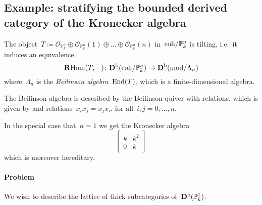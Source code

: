 \documentclass[10pt,a4paper]{article}
\begin{document}
\subsection{Example: stratifying the bounded derived category of the Kronecker algebra}
\begin{theorem}[Beilinson]
  The object~$T\coloneqq\mathcal{O}_{\mathbb{P}_k^n}\oplus\mathcal{O}_{\mathbb{P}_k^n}(1)\oplus\ldots\oplus\mathcal{O}_{\mathbb{P}_k^n}(n)$ in~$\mathrm{coh}/\mathbb{P}_k^n$ is tilting, i.e.\ it induces an equivalence
  \begin{equation}
    \operatorname{\mathbf{R}Hom}(T,-)\colon\mathbf{D}^{\mathrm{b}}(\mathrm{coh}/\mathbb{P}_k^n)\to\mathbf{D}^{\mathrm{b}}(\mathrm{mod}/\Lambda_n)
  \end{equation}
  where~$\Lambda_n$ is the \emph{Beilinson algebra}~$\operatorname{End}(T)$, which is a finite-dimensional algebra.
\end{theorem}
The Beilinson algebra is described by the Beilinson quiver with relations, which is given by
and relations~$x_ix_j=x_jx_i$, for all~$i,j=0,\dotsc,n$.

In the special case that~$n=1$ we get the Kronecker algebra
\begin{equation}
  \begin{bmatrix} k & k^2 \\ 0 & k \end{bmatrix} 
\end{equation}
which is moreover hereditary.

\paragraph{Problem} We wish to describe the lattice of thick subcategories of~$\mathbf{D}^{\mathrm{b}}(\mathbb{P}_k^1)$.
\end{document}
